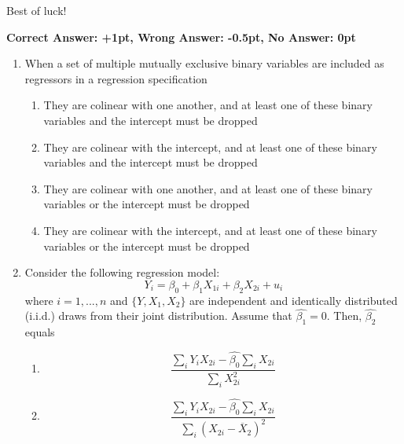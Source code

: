 \documentclass{article}
\begin{document}
\vspace{1cm}

Best of luck!


\newpage

{\large \textbf{Correct Answer: +1pt, Wrong Answer: -0.5pt, No Answer: 0pt}}\\[1em]


\begin{enumerate}

\item  When a set of multiple mutually exclusive binary variables are included as regressors in a regression specification
  \begin{enumerate}[label=\alph*)]
  \item They are colinear with one another, and at least one of these binary variables and the intercept must be dropped  
  \item They are colinear with the intercept, and at least one of these binary variables and the intercept must be dropped  
  \item They are colinear with one another, and at least one of these binary variables or the intercept must be dropped  
  \item They are colinear with the intercept, and at least one of these binary variables or the intercept must be dropped  
  \end{enumerate}\vspace{.25cm}

\item Consider the following regression model:
\begin{equation*}
    Y_i = \beta_0 + \beta_1 X_{1i} + \beta_2 X_{2i} + u_i
\end{equation*}
where $i=1,...,n$ and $\{Y, X_1, X_2\}$ are independent and identically distributed (i.i.d.) draws from their joint
distribution. Assume that $\hat{\beta_1}=0$. Then,  $\hat{\beta_2}$ equals

\begin{enumerate}[label=\alph*)]
\item \begin{equation*}
    \frac{\sum_i Y_iX_{2i}-\hat{\beta_0}\sum_i X_{2i}}{\sum_i X_{2i}^2}
\end{equation*}

\item \begin{equation*}
    \frac{\sum_i Y_iX_{2i}-\hat{\beta_0}\sum_i X_{2i}}{\sum_i (X_{2i}-\overline{X}_2)^2}
\end{equation*}


\end{enumerate}
\end{enumerate}
\end{document}

